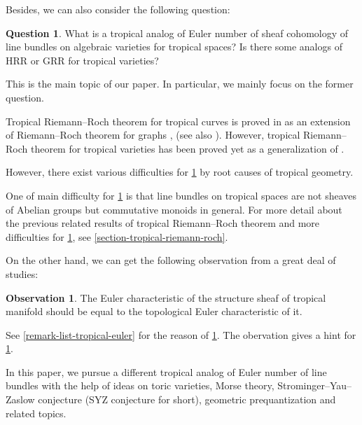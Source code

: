 \documentclass[a4paper,dvipdfmx,reqno,12pt]{amsart}
\theoremstyle{definition}
\newtheorem{question}[theorem]{Question}
\newtheorem{observation}[theorem]{Observation}
\numberwithin{equation}{section}
\begin{document}
Besides, we can also consider the following question:

\begin{question} \label{question-tropical-euler}
What is a tropical analog of Euler number of sheaf 
cohomology of line bundles on algebraic varieties for 
tropical spaces? Is there some analogs of HRR or GRR 
for tropical varieties?
\end{question}

This is the main topic of our paper.
In particular, we mainly focus on
the former question.

Tropical Riemann--Roch theorem for tropical curves 
is proved in \cite{gathmannRiemannRochTheoremTropical2008a}
as an extension of Riemann--Roch theorem for graphs
\cite{MR2355607}, (see also 
\cite{mikhalkinTropicalCurvesTheir2008a}). 
However, tropical Riemann--Roch theorem 
for tropical varieties has been proved yet 
as a generalization of 
\cite{gathmannRiemannRochTheoremTropical2008a}.

However, there exist various difficulties for 
\cref{question-tropical-euler} by root causes of 
tropical geometry.

One of main difficulty for \cref{question-tropical-euler} 
is that line bundles on tropical spaces are not sheaves of 
Abelian groups but commutative monoids in general.
For more detail about the previous related results of 
tropical Riemann--Roch theorem
and more difficulties for 
\cref{question-tropical-euler}, see 
\cref{section-tropical-riemann-roch}.

On the other hand, we can get the following 
observation from a great deal of studies:
\begin{observation} \label{observation-tropical-euler}
The Euler characteristic of the structure sheaf of 
tropical manifold should be equal to 
the topological Euler characteristic of it.
\end{observation}
See \cref{remark-list-tropical-euler} for the reason of 
\cref{observation-tropical-euler}. 
The obervation gives a hint for
\cref{question-tropical-euler}.  







In this paper, we pursue a different tropical
analog of Euler number of line bundles with the help of 
ideas on toric varieties, Morse theory,
Strominger--Yau--Zaslow conjecture
(SYZ conjecture for short), geometric prequantization
and related topics.
\end{document}
